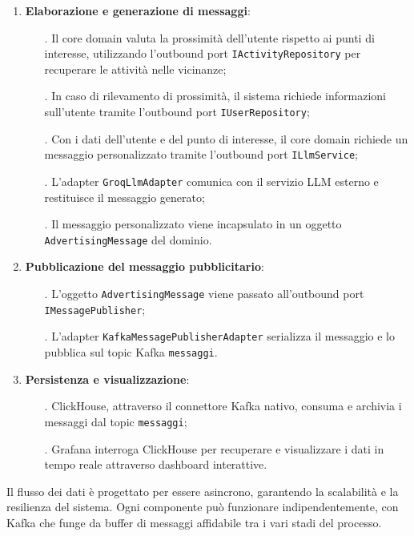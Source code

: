 \documentclass[10pt]{article}
\begin{document}
\begin{enumerate}
        \item \textbf{Elaborazione e generazione di messaggi}:
        \begin{itemize}
            \item[.] Il core domain valuta la prossimità dell'utente rispetto ai punti di interesse, utilizzando l'outbound port \texttt{IActivityRepository} per recuperare le attività nelle vicinanze;
            \item[.] In caso di rilevamento di prossimità, il sistema richiede informazioni sull'utente tramite l'outbound port \texttt{IUserRepository};
            \item[.] Con i dati dell'utente e del punto di interesse, il core domain richiede un messaggio personalizzato tramite l'outbound port \texttt{ILlmService};
            \item[.] L'adapter \texttt{GroqLlmAdapter} comunica con il servizio LLM esterno e restituisce il messaggio generato;
            \item[.] Il messaggio personalizzato viene incapsulato in un oggetto \texttt{AdvertisingMessage} del dominio.
        \end{itemize}
        
        \item \textbf{Pubblicazione del messaggio pubblicitario}:
        \begin{itemize}
            \item[.] L'oggetto \texttt{AdvertisingMessage} viene passato all'outbound port \texttt{IMessagePublisher};
            \item[.] L'adapter \texttt{KafkaMessagePublisherAdapter} serializza il messaggio e lo pubblica sul topic Kafka \texttt{messaggi}.
        \end{itemize}
        
        \item \textbf{Persistenza e visualizzazione}:
        \begin{itemize}
            \item[.] ClickHouse, attraverso il connettore Kafka nativo, consuma e archivia i messaggi dal topic \texttt{messaggi};
            \item[.] Grafana interroga ClickHouse per recuperare e visualizzare i dati in tempo reale attraverso dashboard interattive.
        \end{itemize}
    \end{enumerate}
    
    Il flusso dei dati è progettato per essere asincrono, garantendo la scalabilità e la resilienza del sistema. Ogni componente può funzionare indipendentemente, con Kafka che funge da buffer di messaggi affidabile tra i vari stadi del processo.
\end{document}
